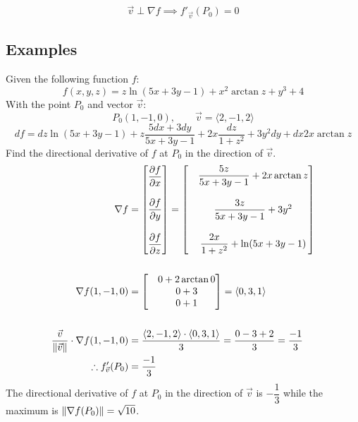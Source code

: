 \begin{equation}
    \vec{v} \perp \nabla f \implies f'_{\vec{v}}(P_0) = 0
\end{equation}
\pagebreak

\subsection{Examples}

Given the following function $f$:
\[
    f(x, y, z) = z\ln{(5x+3y-1)} + x^2 \arctan{z} + y^3 + 4
\]
With the point $P_0$ and vector $\vec{v}$:
\[
    P_0(1, -1, 0), \qquad\vec{v} = \langle 2, -1, 2 \rangle
\]
\[ df = dz \ln{(5x+3y-1)} + z \dfrac{5dx + 3dy}{5x+3y-1} + 2x \dfrac{dz}{1+z^2} + 3y^2 dy + dx 2x\arctan{z} 
\]
Find the directional derivative of $f$ at $P_0$ in the direction of $\vec{v}$.
\begin{align*}
    \nabla f &= \begin{bmatrix}
        \dfrac{\partial f}{\partial x} \\
        \vspace{.025cm}\\
        \dfrac{\partial f}{\partial y} \\
        \vspace{.025cm}\\
        \dfrac{\partial f}{\partial z}
    \end{bmatrix} = 
    \begin{bmatrix}
        &\dfrac{5z}{5x+3y-1} + 2x\arctan{z} \\
        &\vspace{.025cm}\\
        &\dfrac{3z}{5x+3y-1} + 3y^2 \\
        &\vspace{.025cm}\\
        &\dfrac{2x}{1+z^2} + \ln(5x+3y-1)
    \end{bmatrix} \\
    \vspace{1cm}\\
    \nabla f(1, -1, 0) &= \begin{bmatrix}
        &0 + 2\arctan{0} \\
        &0 + 3 \\
        &0 + 1
    \end{bmatrix} = 
    \left<0, 3, 1\right> \\ 
    \vspace{1cm}\\
    \dfrac{\vec{v}}{\magn{\vec{v}}} \cdot \nabla f(1, -1, 0) &= \dfrac{\left<2, -1, 2\right> \cdot \left<0, 3, 1\right>}{3} = \dfrac{0 - 3 + 2}{3} = \dfrac{-1}{3} \\ 
    \therefore f'_{\vec{v}}(P_0) &= \dfrac{-1}{3}
\end{align*}
The directional derivative of $f$ at $P_0$ in the direction of $\vec{v}$ is $-\dfrac{1}{3}$ while the maximum is $\left\Vert\nabla f(P_0)\right\Vert = \sqrt{10}$.